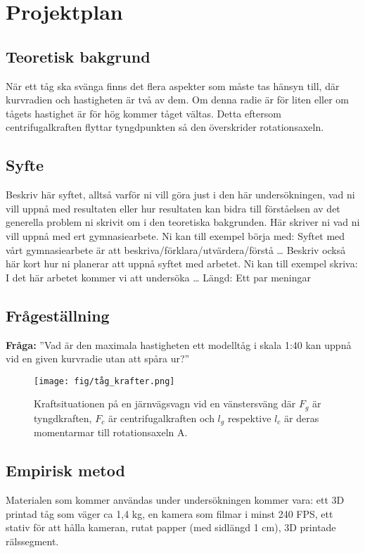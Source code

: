 \section{Projektplan}
\subsection{Teoretisk bakgrund}
När ett tåg ska svänga finns det flera aspekter som måste tas hänsyn till, där kurvradien och hastigheten är två av dem. Om denna radie är för liten eller om tågets hastighet är för hög kommer tåget vältas. Detta eftersom centrifugalkraften flyttar tyngdpunkten så den överskrider rotationsaxeln.
\subsection{Syfte}
Beskriv här syftet, alltså varför ni vill göra just i den här undersökningen, vad ni vill uppnå med resultaten eller hur resultaten kan bidra till förståelsen av det generella problem ni skrivit om i den teoretiska bakgrunden. Här skriver ni vad ni vill uppnå med ert gymnasiearbete. Ni kan till exempel börja med: Syftet med vårt gymnasiearbete är att beskriva/förklara/utvärdera/förstå … Beskriv också här kort hur ni planerar att uppnå syftet med arbetet. Ni kan till exempel skriva: I det här arbetet kommer vi att undersöka …
Längd: Ett par meningar

\subsection{Frågeställning}
\textbf{Fråga:} ''Vad är den maximala hastigheten ett modelltåg i skala 1:40 kan uppnå vid en given kurvradie utan att spåra ur?''

\begin{figure}[h!]
    \centering
    \texttt{[image: fig/tåg\_krafter.png]}
    \caption{Kraftsituationen på en järnvägsvagn vid en vänstersväng där $F_g$ är tyngdkraften, $F_c$ är centrifugalkraften och $l_g$ respektive $l_c$ är deras momentarmar till rotationsaxeln A.}
    \label{fig:tåg_krafter_sväng}
\end{figure}

\subsection{Empirisk metod}
Materialen som kommer användas under undersökningen kommer vara: ett 3D printad tåg som väger ca 1,4 kg, en kamera som filmar i minst 240 FPS, ett stativ för att hålla kameran, rutat papper (med sidlängd 1 cm), 3D printade rälssegment.

